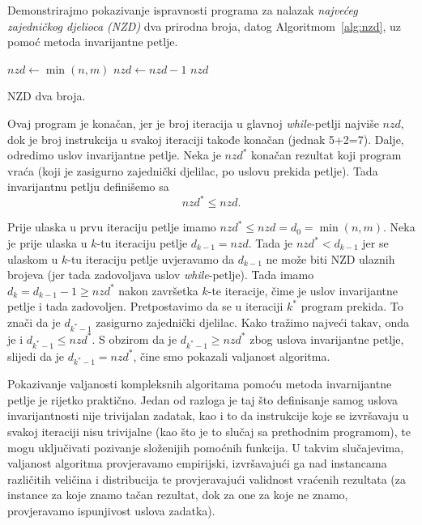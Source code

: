 \begin{example}
Demonstrirajmo   pokazivanje ispravnosti programa za nalazak \textit{najvećeg zajedničkog djelioca (NZD)} dva prirodna broja, datog   Algoritmom~\ref{alg:nzd}, uz pomoć metoda invarijantne petlje.


\begin{algorithm}
	\begin{algorithmic}[1]
		\State $nzd \gets \min(n, m)$
		    \State $nzd \gets nzd - 1$
		\EndWhile
		\State \Return $nzd$
		\EndProcedure
	\end{algorithmic}
   \caption{NZD dva broja.} \label{alg:nzd}
\end{algorithm}

Ovaj program je konačan, jer je broj iteracija u glavnoj \emph{while}-petlji najviše $nzd$, dok je broj instrukcija u svakoj iteraciji takođe konačan (jednak 5+2=7). Dalje, odredimo uslov invarijantne petlje. Neka je ${nzd}^*$ konačan rezultat koji program vraća (koji je zasigurno zajednički djelilac, po uslovu prekida petlje). Tada  invarijantnu petlju definišemo sa 
$$ nzd^* \leq nzd.$$

Prije ulaska u prvu iteraciju petlje imamo $nzd^* \leq nzd = d_0 = \min(n, m)$. 
Neka je prije ulaska u $k$-tu iteraciju petlje $d_{k-1} = nzd$. Tada je  $nzd^* < d_{k-1}$ jer se  ulaskom u $k$-tu iteraciju petlje uvjeravamo da $d_{k-1}$ ne može biti NZD ulaznih brojeva (jer tada zadovoljava uslov \textit{while}-petlje). Tada imamo $d_{k} = d_{k-1} -1 \geq nzd^*$ nakon završetka $k$-te iteracije, čime je uslov invarijantne petlje i tada zadovoljen.   Pretpostavimo da se u iteraciji $k^*$ program prekida. To znači da je $d_{k^*-1}$ zasigurno zajednički djelilac. Kako tražimo najveći takav, onda je i $d_{k^*-1} \leq nzd^*$. S obzirom da je  $d_{k^*-1} \geq nzd^*$ zbog uslova invarijantne petlje, slijedi da je 
$d_{k^*-1} = nzd^*$, čine smo pokazali valjanost algoritma.
\end{example}
Pokazivanje valjanosti kompleksnih algoritama pomoću metoda invarnijantne petlje je rijetko  praktično. Jedan od razloga je taj što definisanje samog uslova invarijantnosti nije trivijalan zadatak, kao  i to da instrukcije koje se izvršavaju u svakoj iteraciji nisu trivijalne  (kao što je to slučaj sa prethodnim programom), te mogu uključivati  pozivanje složenijih pomoćnih funkcija. U takvim slučajevima, valjanost algoritma provjeravamo empirijski, izvršavajući ga nad instancama različitih veličina i distribucija te provjeravajući  validnost vraćenih rezultata (za instance za koje znamo tačan rezultat, dok za one za koje ne znamo, provjeravamo ispunjivost uslova zadatka). 

